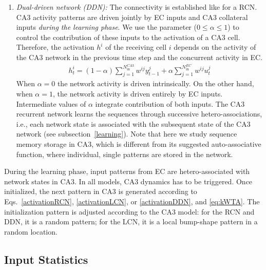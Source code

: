 \documentclass[utf8]{frontiersSCNS} %
\begin{document}
\begin{enumerate}
\item \textit{Dual-driven network (DDN):} The connectivity is established like for a RCN.
%
CA3 activity patterns are driven jointly by EC inputs and CA3 collateral inputs \textit{during the learning phase}.
%
We use the parameter ($0 \leq \alpha \leq 1$) to control the contribution of these inputs to the activation of a CA3 cell. 
%
Therefore, the activation $h^i$ of the receiving cell $i$ depends on the activity of the CA3 network in the previous time step and the concurrent activity in EC.
%
\begin{align}
\label{activationDDN}
h^{i}_{t} = (1 - \alpha) \sum_{j = 1}^{N^{CA3}_\mathrm{in}} {{w^{ij} y^{j}_{t-1}}} + \alpha \sum_{j = 1}^{N^{EC}_\mathrm{in}} {{w^{ij} u^{j}_{t}}} 
\end{align}
%
When $\alpha = 0$ the network activity is driven intrinsically. On the other hand, when $\alpha = 1$, the network activity is driven entirely by EC inputs. Intermediate values of $\alpha$ integrate contribution of both inputs.
%
The CA3 recurrent network learns the sequences through successive hetero-associations, i.e.,  each network state is associated with the subsequent state of the CA3 network (see subsection~\ref{learning}).
%
Note that here we study sequence memory storage in CA3, which is different from its suggested auto-associative function, where individual, single patterns are stored in the network.
\end{enumerate}

During the learning phase, input patterns from EC are hetero-associated with network states in CA3. In all models, CA3 dynamics has to be triggered. Once initialized, the next pattern in CA3 is generated according to Eqs.~\ref{activationRCN}, \ref{activationLCN}, or \ref{activationDDN}, and \ref{eq:kWTA}.
The initialization pattern is adjusted according to the CA3 model: for the RCN and DDN, it is a random pattern; for the LCN, it is a local bump-shape pattern in a random location.
%

\subsection{Input Statistics}
\end{document}
